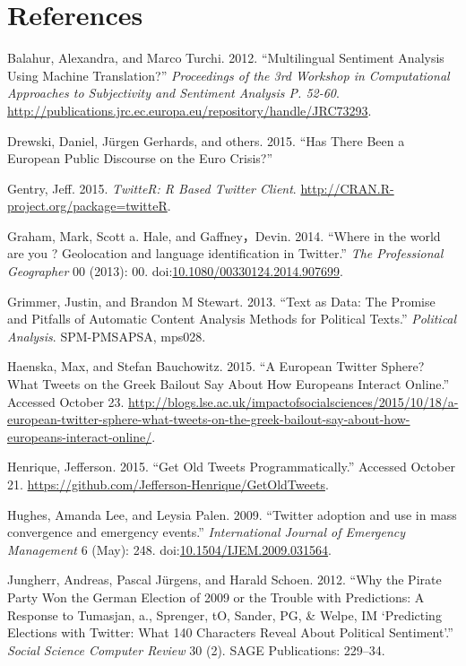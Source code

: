 \documentclass[]{article}
\begin{document}
\section*{References}\label{references}

Balahur, Alexandra, and Marco Turchi. 2012. ``Multilingual Sentiment
Analysis Using Machine Translation?'' \emph{Proceedings of the 3rd
Workshop in Computational Approaches to Subjectivity and Sentiment
Analysis P. 52-60}.
\url{http://publications.jrc.ec.europa.eu/repository/handle/JRC73293}.

Drewski, Daniel, J{ü}rgen Gerhards, and others. 2015. ``Has There Been a
European Public Discourse on the Euro Crisis?''

Gentry, Jeff. 2015. \emph{TwitteR: R Based Twitter Client}.
\url{http://CRAN.R-project.org/package=twitteR}.

Graham, Mark, Scott a. Hale, and Gaffney，Devin. 2014. ``Where in the
world are you ? Geolocation and language identification in Twitter.''
\emph{The Professional Geographer} 00 (2013): 00.
doi:\href{http://dx.doi.org/10.1080/00330124.2014.907699}{10.1080/00330124.2014.907699}.

Grimmer, Justin, and Brandon M Stewart. 2013. ``Text as Data: The
Promise and Pitfalls of Automatic Content Analysis Methods for Political
Texts.'' \emph{Political Analysis}. SPM-PMSAPSA, mps028.

Haenska, Max, and Stefan Bauchowitz. 2015. ``A European Twitter Sphere?
What Tweets on the Greek Bailout Say About How Europeans Interact
Online.'' Accessed October 23.
\url{http://blogs.lse.ac.uk/impactofsocialsciences/2015/10/18/a-european-twitter-sphere-what-tweets-on-the-greek-bailout-say-about-how-europeans-interact-online/}.

Henrique, Jefferson. 2015. ``Get Old Tweets Programmatically.'' Accessed
October 21. \url{https://github.com/Jefferson-Henrique/GetOldTweets}.

Hughes, Amanda Lee, and Leysia Palen. 2009. ``Twitter adoption and use
in mass convergence and emergency events.'' \emph{International Journal
of Emergency Management} 6 (May): 248.
doi:\href{http://dx.doi.org/10.1504/IJEM.2009.031564}{10.1504/IJEM.2009.031564}.

Jungherr, Andreas, Pascal J{ü}rgens, and Harald Schoen. 2012. ``Why the
Pirate Party Won the German Election of 2009 or the Trouble with
Predictions: A Response to Tumasjan, a., Sprenger, tO, Sander, PG, \&
Welpe, IM `Predicting Elections with Twitter: What 140 Characters Reveal
About Political Sentiment'.'' \emph{Social Science Computer Review} 30
(2). SAGE Publications: 229--34.
\end{document}
